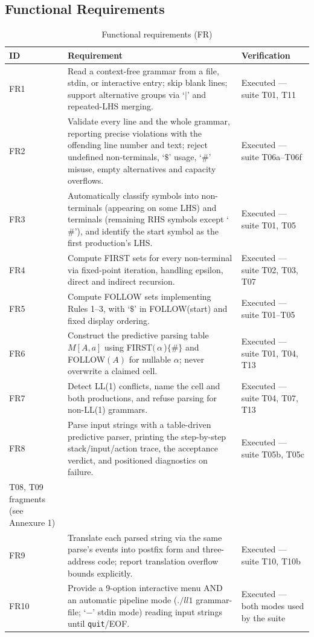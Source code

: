 \documentclass[12pt,a4paper,oneside,openany]{report}
\newcommand{\code}[1]{\texttt{#1}}
\begin{document}
\subsection{Functional Requirements}
\begin{table}[h]
  \caption{Functional requirements (FR)}
  \label{tab:fr}
  \small
  \begin{tabularx}{\textwidth}{p{1.2cm}X p{4.6cm}}
    \toprule
    \textbf{ID} & \textbf{Requirement} & \textbf{Verification} \\
    \midrule
    FR1 & Read a context-free grammar from a file, stdin, or interactive
    entry; skip blank lines; support alternative groups via `$|$' and
    repeated-LHS merging. & Executed --- suite T01, T11 \\
    FR2 & Validate every line and the whole grammar, reporting precise
    violations with the offending line number and text; reject undefined
    non-terminals, `$\$$' usage, `$\#$' misuse, empty alternatives and
    capacity overflows. & Executed --- suite T06a--T06f \\
    FR3 & Automatically classify symbols into non-terminals (appearing on
    some LHS) and terminals (remaining RHS symbols except `$\#$'), and
    identify the start symbol as the first production's LHS. & Executed ---
    suite T01, T05 \\
    FR4 & Compute FIRST sets for every non-terminal via fixed-point
    iteration, handling epsilon, direct and indirect recursion. &
    Executed --- suite T02, T03, T07 \\
    FR5 & Compute FOLLOW sets implementing Rules 1--3, with `$\$$' in
    FOLLOW(start) and fixed display ordering. & Executed --- suite
    T01--T05 \\
    FR6 & Construct the predictive parsing table $M[A,a]$ using
    FIRST$($\,$\alpha$\,)$\{$\#$\}$ and FOLLOW$(A)$ for nullable $\alpha$;
    never overwrite a claimed cell. & Executed --- suite T01, T04, T13 \\
    FR7 & Detect LL(1) conflicts, name the cell and both productions, and
    refuse parsing for non-LL(1) grammars. & Executed --- suite T04, T07,
    T13 \\
    FR8 & Parse input strings with a table-driven predictive parser,
    printing the step-by-step stack/input/action trace, the acceptance
    verdict, and positioned diagnostics on failure. & Executed --- suite
    T05b, T05c \\
    T08, T09 fragments (see Annexure 1) \\
    \midrule
    FR9 & Translate each parsed string via the same parse's events into
    postfix form and three-address code; report translation overflow
    bounds explicitly. & Executed --- suite T10, T10b \\
    FR10 & Provide a 9-option interactive menu AND an automatic pipeline
    mode ($./ll1$ grammar-file; `$-$' stdin mode) reading input strings
    until \code{quit}/EOF. & Executed --- both modes used by the suite \\
    \bottomrule
  \end{tabularx}
\end{table}
\end{document}
